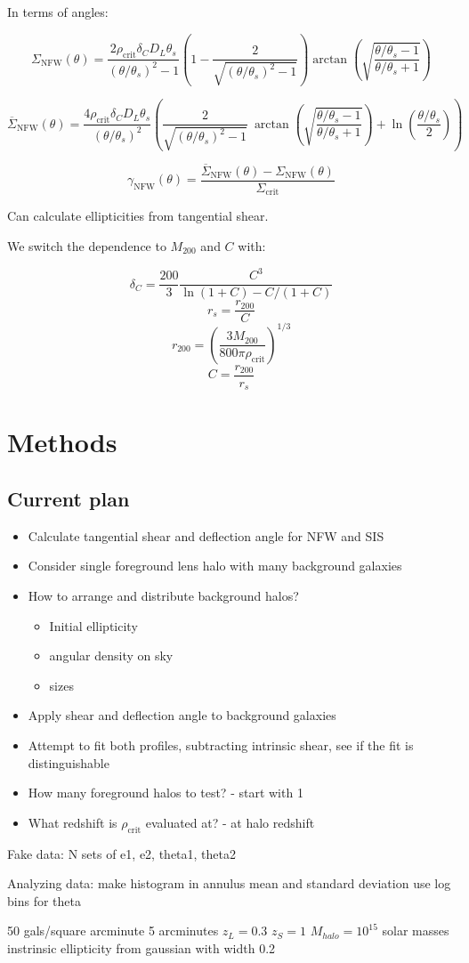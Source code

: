 \documentclass[]{article}
\begin{document}
In terms of angles:

\[\Sigma_\mathrm{NFW}(\theta) = \frac{2 \rho_\mathrm{crit} \delta_C D_L \theta_s}{(\theta/\theta_s)^2 - 1} \left(1 - \frac{2}{\sqrt{(\theta/\theta_s)^2 - 1}} \right) \arctan\left(\sqrt{\frac{\theta/\theta_s - 1}{\theta/\theta_s + 1}} \right)\]

\[\overline{\Sigma}_\mathrm{NFW}(\theta) = \frac{4 \rho_\mathrm{crit} \delta_C D_L \theta_s}{(\theta/\theta_s)^2} \left(
    \frac{2}{\sqrt{(\theta/\theta_s)^2 - 1}} ~\arctan\left(\sqrt{\frac{\theta/\theta_s - 1}{\theta/\theta_s + 1}} \right) + \ln{\left(\frac{\theta/\theta_s}{2}\right)}
\right)\]

\[\gamma_\mathrm{NFW}(\theta) = \frac{\overline{\Sigma}_\mathrm{NFW}(\theta) - \Sigma_\mathrm{NFW}(\theta)}{\Sigma_\mathrm{crit}} \]

Can calculate ellipticities from tangential shear.

We switch the dependence to $M_{200}$ and $C$ with:

\[\delta_C = \frac{200}{3} \frac{C^3}{\ln(1 + C) - C/(1 + C)}\]
\[r_s = \frac{r_{200}}{C}\]
\[r_{200} = \left( \frac{3 M_{200}}{800 \pi \rho_\mathrm{crit}} \right)^{1/3}\]
\[C = \frac{r_{200}}{r_s}\]


\section{Methods}

\subsection{Current plan}
\begin{itemize}
    \item Calculate tangential shear and deflection angle for NFW and SIS
    \item Consider single foreground lens halo with many background galaxies
    \item How to arrange and distribute background halos?
    \begin{itemize}
        \item Initial ellipticity
        \item angular density on sky
        \item sizes
    \end{itemize}
    \item Apply shear and deflection angle to background galaxies
    \item Attempt to fit both profiles, subtracting intrinsic shear, see if the fit is distinguishable
    \item How many foreground halos to test? - start with 1
    \item What redshift is $\rho_\mathrm{crit}$ evaluated at? - at halo redshift

\end{itemize}

Fake data:
N sets of e1, e2, theta1, theta2

Analyzing data:
make histogram in annulus
mean and standard deviation
use log bins for theta


50 gals/square arcminute
5 arcminutes
$z_L = 0.3$
$z_S = 1$
$M_{halo} = 10^15$ solar masses
instrinsic ellipticity from gaussian with width 0.2
\end{document}
